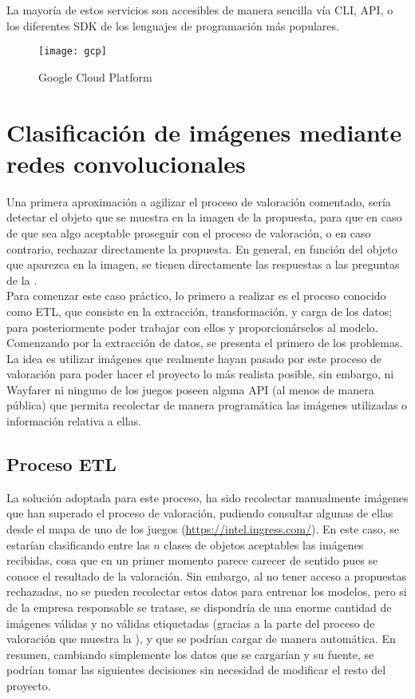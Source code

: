 			La mayoría de estos servicios son accesibles de manera sencilla vía CLI, API, o los diferentes SDK de los lenguajes de programación más populares. 
			
			\begin{figure}[!h]
				\centering
				\texttt{[image: gcp]}
				\caption{Google Cloud Platform}
				\label{fig:gcp}
			\end{figure}
			
			

	\section{Clasificación de imágenes mediante redes convolucionales}
	
		Una primera aproximación a agilizar el proceso de valoración comentado, sería detectar el objeto que se muestra en la imagen de la propuesta, para que en caso de que sea algo aceptable proseguir con el proceso de valoración, o en caso contrario, rechazar directamente la propuesta. En general, en función del objeto que aparezca en la imagen, se tienen directamente las respuestas a las preguntas de la . \\
		
		Para comenzar este caso práctico, lo primero a realizar es el proceso conocido como ETL, que consiste en la extracción, transformación, y carga de los datos; para posteriormente poder trabajar con ellos y proporcionárselos al modelo. Comenzando por la extracción de datos, se presenta el primero de los problemas. La idea es utilizar imágenes que realmente hayan pasado por este proceso de valoración para poder hacer el proyecto lo más realista posible, sin embargo, ni Wayfarer ni ninguno de los juegos poseen alguna API (al menos de manera pública) que permita recolectar de manera programática las imágenes utilizadas o información relativa a ellas. 
		
		\subsection{Proceso ETL}
		
			La solución adoptada para este proceso, ha sido recolectar manualmente imágenes que han superado el proceso de valoración, pudiendo consultar algunas de ellas desde el mapa de uno de los juegos (\url{https://intel.ingress.com/}). En este caso, se estarían clasificando entre las $n$ clases de objetos aceptables las imágenes recibidas, cosa que en un primer momento parece carecer de sentido pues se conoce el resultado de la valoración. Sin embargo, al no tener acceso a propuestas rechazadas, no se pueden recolectar estos datos para entrenar los modelos, pero si de la empresa responsable se tratase, se dispondría de una enorme cantidad de imágenes válidas y no válidas etiquetadas (gracias a la parte del proceso de valoración que muestra la ), y que se podrían cargar de manera automática. En resumen, cambiando simplemente los datos que se cargarían y su fuente, se podrían tomar las siguientes decisiones sin necesidad de modificar el resto del proyecto.  
			
